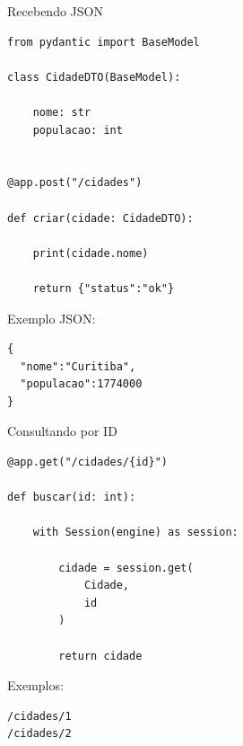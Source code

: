 \documentclass{beamer}
\begin{document}
\begin{frame}[fragile]{Recebendo JSON}

\begin{verbatim}
from pydantic import BaseModel

class CidadeDTO(BaseModel):

    nome: str
    populacao: int


@app.post("/cidades")

def criar(cidade: CidadeDTO):

    print(cidade.nome)

    return {"status":"ok"}
\end{verbatim}

\vspace{0.3cm}

Exemplo JSON:

\begin{verbatim}
{
  "nome":"Curitiba",
  "populacao":1774000
}
\end{verbatim}

\end{frame}

\begin{frame}[fragile]{Consultando por ID}

\begin{verbatim}
@app.get("/cidades/{id}")

def buscar(id: int):

    with Session(engine) as session:

        cidade = session.get(
            Cidade,
            id
        )

        return cidade
\end{verbatim}

\vspace{0.3cm}

Exemplos:

\begin{verbatim}
/cidades/1
/cidades/2
\end{verbatim}

\end{frame}
\end{document}
